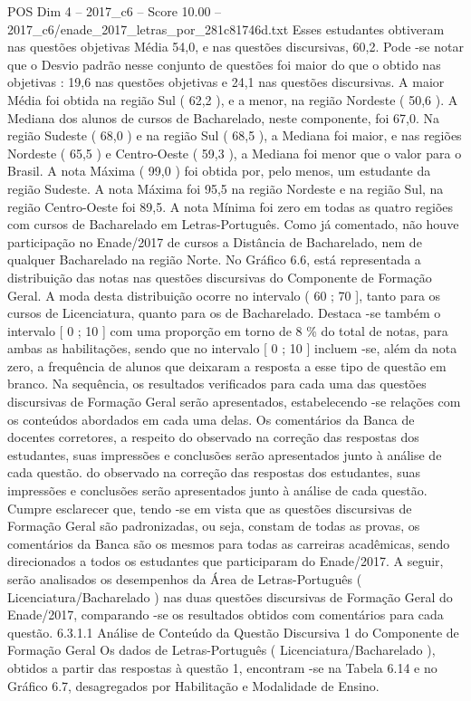 \begin{textsample}{POS Dim 4 – 2017\_c6 – Score 10.00 – 2017\_c6/enade\_2017\_letras\_por\_281c81746d.txt}
Esses estudantes obtiveram nas questões objetivas Média 54,0, e nas questões discursivas, 60,2.
Pode -se notar que o Desvio padrão nesse conjunto de questões foi maior do que o obtido nas objetivas : 19,6 nas questões objetivas e 24,1 nas questões discursivas.
A maior Média foi obtida na região Sul ( 62,2 ), e a menor, na região Nordeste ( 50,6 ).
A Mediana dos alunos de cursos de Bacharelado, neste componente, foi 67,0.
Na região Sudeste ( 68,0 ) e na região Sul ( 68,5 ), a Mediana foi maior, e nas regiões Nordeste ( 65,5 ) e Centro-Oeste ( 59,3 ), a Mediana foi menor que o valor para o Brasil.
A nota Máxima ( 99,0 ) foi obtida por, pelo menos, um estudante da região Sudeste.
A nota Máxima foi 95,5 na região Nordeste e na região Sul, na região Centro-Oeste foi 89,5.
A nota Mínima foi zero em todas as quatro regiões com cursos de Bacharelado em Letras-Português.
Como já comentado, não houve participação no Enade/2017 de cursos a Distância de Bacharelado, nem de qualquer Bacharelado na região Norte.
No Gráfico 6.6, está representada a distribuição das notas nas questões discursivas do Componente de Formação Geral.
A moda desta distribuição ocorre no intervalo ( 60 ; 70 ], tanto para os cursos de Licenciatura, quanto para os de Bacharelado.
Destaca -se também o intervalo [ 0 ; 10 ] com uma proporção em torno de 8 \% do total de notas, para ambas as habilitações, sendo que no intervalo [ 0 ; 10 ] incluem -se, além da nota zero, a frequência de alunos que deixaram a resposta a esse tipo de questão em branco.
Na sequência, os resultados verificados para cada uma das questões discursivas de Formação Geral serão apresentados, estabelecendo -se relações com os conteúdos abordados em cada uma delas.
Os comentários da Banca de docentes corretores, a respeito do observado na correção das respostas dos estudantes, suas impressões e conclusões serão apresentados junto à análise de cada questão. do observado na correção das respostas dos estudantes, suas impressões e conclusões serão apresentados junto à análise de cada questão.
Cumpre esclarecer que, tendo -se em vista que as questões discursivas de Formação Geral são padronizadas, ou seja, constam de todas as provas, os comentários da Banca são os mesmos para todas as carreiras acadêmicas, sendo direcionados a todos os estudantes que participaram do Enade/2017.
A seguir, serão analisados os desempenhos da Área de Letras-Português ( Licenciatura/Bacharelado ) nas duas questões discursivas de Formação Geral do Enade/2017, comparando -se os resultados obtidos com comentários para cada questão. 6.3.1.1 Análise de Conteúdo da Questão Discursiva 1 do Componente de Formação Geral Os dados de Letras-Português ( Licenciatura/Bacharelado ), obtidos a partir das respostas à questão 1, encontram -se na Tabela 6.14 e no Gráfico 6.7, desagregados por Habilitação e Modalidade de Ensino.

\end{textsample}
